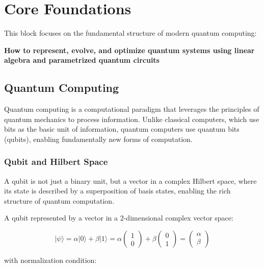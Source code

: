 \chapter{Core Foundations}

This block focuses on the fundamental structure of modern quantum computing:

\begin{center}
\textbf{How to represent, evolve, and optimize quantum systems using linear algebra and parametrized quantum circuits}
\end{center}

\vspace{0.5cm}

\section{Quantum Computing}

Quantum computing is a computational paradigm that leverages the principles of quantum mechanics 
to process information. Unlike classical computers, which use bits as the basic unit of 
information, quantum computers use quantum bits (qubits), enabling fundamentally 
new forms of computation.

\subsection{Qubit and Hilbert Space}

A qubit is not just a binary unit, but a vector in a complex Hilbert space, where its state 
is described by a superposition of basis states, enabling the rich structure of quantum 
computation.

A qubit represented by a vector in a 2-dimensional complex vector space:

\begin{equation}
|\psi\rangle = \alpha |0\rangle + \beta |1\rangle = 
\alpha
\begin{pmatrix}
1 \\
0
\end{pmatrix}
+
\beta
\begin{pmatrix}
0 \\
1
\end{pmatrix}
=
\begin{pmatrix}
\alpha \\
\beta
\end{pmatrix}
\end{equation}

with normalization condition:


